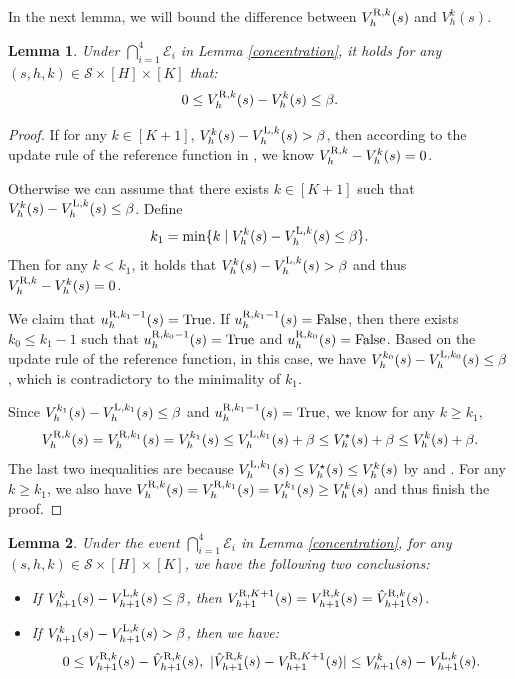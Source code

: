 \documentclass{article}
\newtheorem{lemma}{Lemma}[section]
\newcommand{\LL}{\textnormal{L}}
\newcommand{\R}{\textnormal{R}}
\begin{document}
In the next lemma, we will bound the difference between $V_h^{\R,k}(s)$ and $V_h^k(s)$.
\begin{lemma}
    \label{R-kdiff}
    Under $\bigcap_{i=1}^{4}\mathcal{E}_i$ in Lemma \ref{concentration}, it holds for any $(s,h,k) \in  \mathcal{S} \times [H]\times[K]$ that:
    $$0\leq V_h^{\R, k}(s) - V_h^k(s) \leq \beta.$$
\end{lemma}
\begin{proof}
    If for any $k \in [K+1]$, $V_h^k(s) - V_h^{\LL,k}(s) > \beta $, then according to the update rule of the reference function in , we know $V_h^{\R,k} - V_h^k(s) = 0$.

    Otherwise we can assume that there exists $k \in [K+1]$ such that $V_h^k(s) - V_h^{\LL,k}(s) \leq \beta $. Define
    $$k_1 = \min \{k \mid V_h^k(s) - V_h^{\LL,k}(s) \leq \beta\}.$$ Then for any $k < k_1$, it holds that $V_h^k(s) - V_h^{\LL,k}(s) > \beta $ and thus $V_h^{\R,k} - V_h^k(s) = 0$.
    
    We claim that $u_h^{\R,k_1-1}(s) = \textnormal{True}$. If $u_h^{\R,k_1-1}(s) = \textnormal{False}$, then there exists $k_0 \leq k_1-1$ such that $u_h^{\R,k_0 -1}(s) = \textnormal{True}$ and $u_h^{\R,k_0}(s) = \textnormal{False}$. Based on the update rule of the reference function, in this case, we have $V_h^{k_0}(s) - V_h^{\LL,k_0}(s) \leq \beta$, which is contradictory to the minimality of $k_1$.

    Since $V_h^{k_1}(s) - V_h^{\LL,k_1}(s) \leq \beta $ and $u_h^{\R,k_1-1}(s) = \textnormal{True}$, we know for any $k \geq k_1$, $$V_h^{\R,k}(s) = V_h^{\R,k_1}(s) = V_h^{k_1}(s) \leq V_h^{\LL,k_1}(s) + \beta \leq V_h^{\star}(s) + \beta \leq V_h^k(s) + \beta.$$
    The last two inequalities are because $V_h^{\LL,k_1}(s) \leq V_h^{\star}(s) \leq  V_h^k(s)$ by  and . For any $k \geq k_1$, we also have
    $V_h^{\R,k}(s) = V_h^{\R,k_1}(s) = V_h^{k_1}(s) \geq V_h^k(s)$ and thus finish the proof.
\end{proof}
\begin{lemma}
\label{settlecondition}
Under the event $\bigcap_{i=1}^{4}\mathcal{E}_i$ in Lemma \ref{concentration}, for any $(s,h,k) \in \mathcal{S} \times [H] \times [K]$, we have the following two conclusions:
    \begin{itemize}
        \item If $V_{h+1}^k(s) - V_{h+1}^{\LL,k}(s) \leq \beta $, then $V_{h+1}^{\R,K+1}(s) = V_{h+1}^{\R,k}(s) = \hat{V}_{h+1}^{\R,k}(s)$.
        \item If $V_{h+1}^k(s) - V_{h+1}^{\LL,k}(s) > \beta $, then we have:
        $$0 \leq V_{{h}+1}^{\R,k}(s)-\hat{V}_{{h}+1}^{\R,k}(s),\ |\hat{V}_{{h}+1}^{\R,k}(s)-V_{{h}+1}^{\R,K+1}(s)| \leq V_{h+1}^{k}(s)-V_{h+1}^{\LL, k}(s).$$
    \end{itemize}
\end{lemma}
\end{document}
